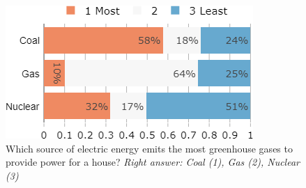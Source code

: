 \begin{framefont}{\small}
\begin{frame}{}%
\begin{figure}
\caption{Which source of electric energy emits the most greenhouse gases to provide power for a house?
\newline \footnotesize{\textit{Right answer: Coal (1), Gas (2), Nuclear (3)}}}
\includegraphics[width=.43\paperwidth]{../figures/FR/footprint_elec_FR.png}
\end{figure}
\end{frame}


\end{framefont}
